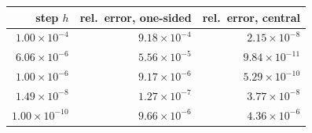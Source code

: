 \begin{tabular}{rrr}
  \toprule
  step $h$ & rel.\ error, one-sided & rel.\ error, central \\
  \midrule
  $1.00\times 10^{-4}$ & $9.18\times 10^{-4}$ & $2.15\times 10^{-8}$ \\
  $6.06\times 10^{-6}$ & $5.56\times 10^{-5}$ & $9.84\times 10^{-11}$ \\
  $1.00\times 10^{-6}$ & $9.17\times 10^{-6}$ & $5.29\times 10^{-10}$ \\
  $1.49\times 10^{-8}$ & $1.27\times 10^{-7}$ & $3.77\times 10^{-8}$ \\
  $1.00\times 10^{-10}$ & $9.66\times 10^{-6}$ & $4.36\times 10^{-6}$ \\
  \bottomrule
\end{tabular}
